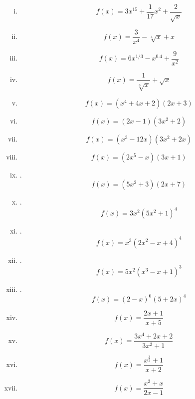 \documentclass[]{article}
\begin{document}
\begin{enumerate}[(i)]
\item		 \[ f(x) = 3x^{15} + \frac{1}{17}x^2 +\frac{2}{\sqrt{x}} \,\] %
\item		 \[ f(x) = \frac{3}{x^4} - \sqrt[4]{x} + x \,\] %
\item		 \[ f(x) = 6x^{1/3}-x^{0.4} +\frac{9}{x^2} \,\] %
\item		 \[ f(x) = \frac{1}{\sqrt[3]{x}} + \sqrt{x} \,\] %
\item		 \[ f(x) = (x^4+4x+2)(2x+3) \,\] %
\item		 \[ f(x) = (2x-1)(3x^2+2) \,\] %
\item		 \[ f(x) = (x^3-12x)(3x^2+2x) \,\] %
\item		 \[ f(x) = (2x^5-x)(3x+1) \,\] %
\item		. \[ f(x) = (5x^2+3)(2x+7)\,\] %
\item		. \[ f(x) = 3x^2(5x^2+1)^4 \,\] %
\item		. \[ f(x) = x^3(2x^2-x+4)^4 \,\] %
\item		. \[ f(x) = 5x^2(x^3-x+1)^3 \,\] %
\item		. \[ f(x) = (2-x)^6(5+2x)^4 \,\] %
\item		\[ f(x) = \frac{2x+1}{x+5} \,\] %
\item		 \[ f(x) = \frac{3x^4+2x +2}{3x^2+1} \,\] %
\item		 \[ f(x) = \frac{x^\frac{3}{2}+1}{x+2} \,\] %
\item		\[ f(x) = \frac{x^2+x}{2x-1} \,\] %

\end{enumerate}
\end{document}
